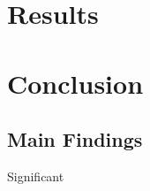 \documentclass{article}
\begin{document}
\section{Results} %






\section{Conclusion} %
\subsection{Main Findings}
Significant

\end{document}
